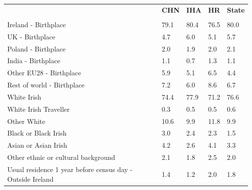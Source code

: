 \documentclass{article}
\begin{document}
\pagebreak
\begin{table}[h]	
\centering
		\begin{tabular}{KTTTT}
  \hline
& \textbf{CHN} & \textbf{IHA} & \textbf{HR}& \textbf{State}\\ 
  \hline
    \\ 
    \hline
Ireland - Birthplace & 79.1& 80.4& 76.5& 80.0\\
UK - Birthplace & 4.7& 6.0& 5.1& 5.7\\
Poland - Birthplace & 2.0& 1.9& 2.0& 2.1\\
India - Birthplace & 1.1& 0.7& 1.3& 1.1\\
Other EU28 - Birthplace & 5.9& 5.1& 6.5& 4.4\\
Rest of world - Birthplace & 7.2& 6.0& 8.6& 6.7\\
    \hline
White Irish & 74.4& 77.9& 71.2& 76.6\\
White Irish Traveller & 0.3& 0.5& 0.5& 0.6\\
Other White & 10.6&  9.9& 11.8&  9.9\\
Black or Black Irish & 3.0& 2.4& 2.3& 1.5\\
Asian or Asian Irish & 4.2& 2.6& 4.1& 3.3\\
Other ethnic or cultural background & 2.1& 1.8& 2.5& 2.0\\
    \hline
Usual residence 1 year before census day - Outside Ireland & 1.4& 1.2& 2.0& 1.8\\


\end{tabular}
\end{table}
\end{document}
